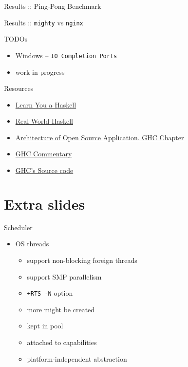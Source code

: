 \documentclass{beamer}
\begin{document}
\begin{frame}{Results :: Ping-Pong Benchmark}
  \centering
\end{frame}

\begin{frame}{Results :: \texttt{mighty} vs \texttt{nginx}}
  \centering
\end{frame}

\begin{frame}{TODOs}
  \begin{itemize}
    \item Windows \pause -- \texttt{IO Completion Ports}
    \pause
    \item work in progress
  \end{itemize}
\end{frame}

\begin{frame}{Resources}
  \begin{itemize}
    \item \href{http://learnyouahaskell.com/}{Learn You a Haskell}
    \item \href{http://book.realworldhaskell.org/read/}{Real World Haskell}
    \item \href{http://www.aosabook.org/en/ghc.html}{Architecture of Open Source Application. GHC Chapter}
    \item \href{http://hackage.haskell.org/trac/ghc/wiki/Commentary}{GHC Commentary}
    \item \href{https://github.com/ghc/ghc}{GHC's Source code}
  \end{itemize}
\end{frame}

\section{Extra slides}
\frame{\tableofcontents[currentsection]}

\begin{frame}{Scheduler}
  \begin{itemize}
    \item OS threads
    \begin{itemize}
      \item support non-blocking foreign threads
      \item support SMP parallelism
      \pause
      \item \texttt{+RTS -N} option
      \item more might be created
      \item kept in pool
      \item attached to capabilities
      \item platform-independent abstraction
    \end{itemize}
  \end{itemize}
\end{frame}
\end{document}
